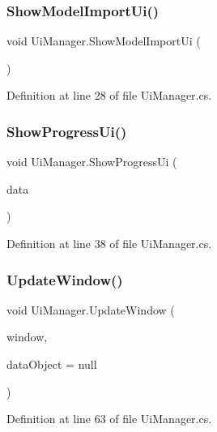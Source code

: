 \subsubsection{\texorpdfstring{ShowModelImportUi()}{ShowModelImportUi()}}
{\footnotesize\ttfamily void Ui\+Manager.\+Show\+Model\+Import\+Ui (\begin{DoxyParamCaption}{ }\end{DoxyParamCaption})}



Definition at line 28 of file Ui\+Manager.\+cs.

\mbox{\label{class_ui_manager_a8d0a41cbac769245cfec85bdbfea7016}} 
\subsubsection{\texorpdfstring{ShowProgressUi()}{ShowProgressUi()}}
{\footnotesize\ttfamily void Ui\+Manager.\+Show\+Progress\+Ui (\begin{DoxyParamCaption}\item[{\mbox{\hyperlink{class_progress_data}{Progress\+Data}}}]{data }\end{DoxyParamCaption})}



Definition at line 38 of file Ui\+Manager.\+cs.

\mbox{\label{class_ui_manager_a5299b0432a8a19d7c98dca26506d7519}} 
\subsubsection{\texorpdfstring{UpdateWindow()}{UpdateWindow()}}
{\footnotesize\ttfamily void Ui\+Manager.\+Update\+Window (\begin{DoxyParamCaption}\item[{\mbox{\hyperlink{interface_i_window}{I\+Window}}}]{window,  }\item[{object}]{data\+Object = {\ttfamily null} }\end{DoxyParamCaption})}



Definition at line 63 of file Ui\+Manager.\+cs.



